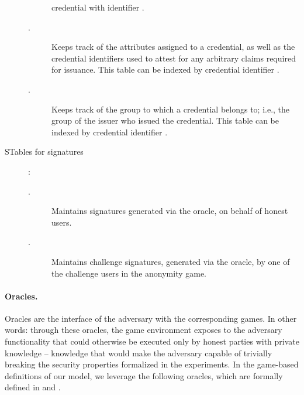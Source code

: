 \begin{description}
\begin{description}
    credential with identifier \cid.
  \item[\ATTR.] Keeps track of the attributes assigned to a credential, as well
    as the credential identifiers used to attest for any arbitrary claims
    required for issuance. This table can be indexed by credential identifier
    \cid.
  \item[\GRP.] Keeps track of the group to which a credential belongs to; i.e.,
    the group of the issuer who issued the credential. This table can be indexed
    by credential identifier \cid.
  \end{description}
\item[STables for signatures]:
  \begin{description}
  \item[\SIG.] Maintains signatures generated via the \SIGN oracle, on behalf
    of honest users.
  \item[\CSIG.] Maintains challenge signatures, generated via the \CHALb oracle,
    by one of the challenge users in the anonymity game.
  \end{description}
\end{description}

\paragraph{Oracles.} %
Oracles are the interface of the adversary with the corresponding games. In
other words: through these oracles, the game environment exposes to the adversary
functionality that could otherwise be executed only by honest parties with
private knowledge -- knowledge that would make the adversary capable of
trivially breaking the security properties formalized in the experiments.
In the game-based definitions of our \UAS model, we leverage the following
oracles, which are formally defined in  and
. 

